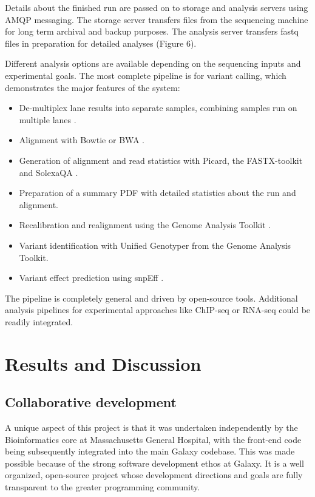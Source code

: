 \documentclass[10pt]{bmc_article}
\newenvironment{bmcformat}{\begin{raggedright}\baselineskip20pt\sloppy\setboolean{publ}{false}}{\end{raggedright}\baselineskip20pt\sloppy}
\begin{document}
\begin{bmcformat}
Details about the finished run are passed on to storage and analysis
servers using AMQP messaging. The storage server transfers files from
the sequencing machine for long term archival and backup purposes. The
analysis server transfers fastq files in preparation for detailed
analyses (Figure 6).

Different analysis options are available depending on the sequencing
inputs and experimental goals. The most complete pipeline is for
variant calling, which demonstrates the major features of the system:

\begin{itemize}
  \item De-multiplex lane results into separate samples, combining
    samples run on multiple lanes \cite{cock_biopython:_2009}.
  \item Alignment with Bowtie or BWA
    \cite{langmead_ultrafast_2009,li_fast_2009}.
  \item Generation of alignment and read statistics with Picard, the
    FASTX-toolkit and SolexaQA
    \cite{_picard_????,_fastx-toolkit_????,cox_solexaqa:_2010}.
  \item Preparation of a summary PDF with detailed statistics
    about the run and alignment.
  \item Recalibration and realignment using the Genome Analysis
    Toolkit
    \cite{mckenna_genome_2010,_pysam_????,gautier_intuitive_2010}.
  \item Variant identification with Unified Genotyper from the Genome
    Analysis Toolkit.
  \item Variant effect prediction using snpEff \cite{_snpeff_????}.
\end{itemize}

The pipeline is completely general and driven by open-source tools.
Additional analysis pipelines for experimental approaches like
ChIP-seq or RNA-seq could be readily integrated.

\section*{Results and Discussion}

\subsection*{Collaborative development}

A unique aspect of this project is that it was undertaken
independently by the Bioinformatics core at Massachusetts General
Hospital, with the front-end code being subsequently integrated
into the main Galaxy codebase. This was made possible because of the
strong software development ethos at Galaxy. It is a well organized,
open-source project whose development directions and goals are fully
transparent to the greater programming community.


\end{bmcformat}
\end{document}
